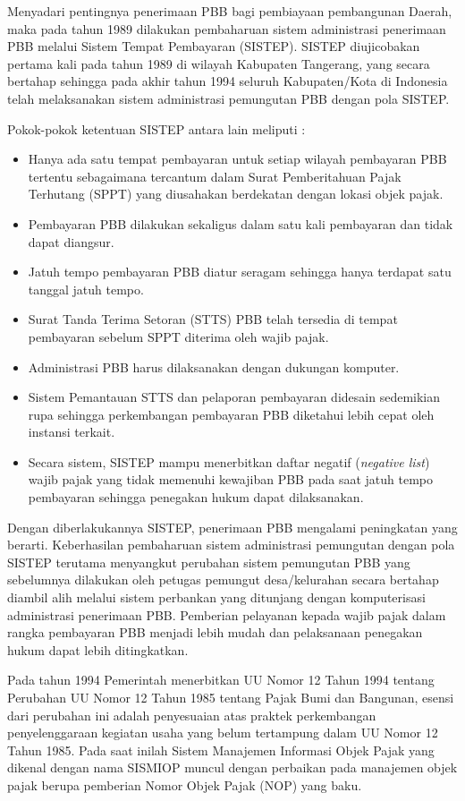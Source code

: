 \documentclass[pdftex, 12pt, oneside]{article}
\begin{document}
Menyadari pentingnya penerimaan PBB bagi pembiayaan pembangunan Daerah, maka pada tahun 1989 dilakukan pembaharuan sistem administrasi penerimaan PBB melalui Sistem Tempat Pembayaran (SISTEP). SISTEP diujicobakan pertama kali pada tahun 1989 di wilayah Kabupaten Tangerang, yang secara bertahap sehingga pada akhir tahun 1994 seluruh Kabupaten/Kota di Indonesia telah melaksanakan sistem administrasi pemungutan PBB dengan pola SISTEP.

Pokok-pokok ketentuan SISTEP antara lain meliputi :

\begin{itemize}
  \item Hanya ada satu tempat pembayaran untuk setiap wilayah pembayaran PBB tertentu sebagaimana tercantum dalam Surat Pemberitahuan Pajak Terhutang (SPPT) yang diusahakan berdekatan dengan lokasi objek pajak.
  \item Pembayaran PBB dilakukan sekaligus dalam satu kali pembayaran dan tidak dapat diangsur.
  \item Jatuh tempo pembayaran PBB diatur seragam sehingga hanya terdapat satu tanggal jatuh tempo.
  \item Surat Tanda Terima Setoran (STTS) PBB telah tersedia di tempat pembayaran sebelum SPPT diterima oleh wajib pajak.
  \item Administrasi PBB harus dilaksanakan dengan dukungan komputer.
  \item Sistem Pemantauan STTS dan pelaporan pembayaran didesain sedemikian rupa sehingga perkembangan pembayaran PBB diketahui lebih cepat oleh instansi terkait.
  \item Secara sistem, SISTEP mampu menerbitkan daftar negatif (\textit{negative list}) wajib pajak yang tidak memenuhi kewajiban PBB pada saat jatuh tempo pembayaran sehingga penegakan hukum dapat dilaksanakan.
\end{itemize}

Dengan diberlakukannya SISTEP, penerimaan PBB mengalami peningkatan yang berarti. Keberhasilan pembaharuan sistem administrasi pemungutan dengan pola SISTEP terutama menyangkut perubahan sistem pemungutan PBB yang sebelumnya dilakukan oleh petugas pemungut desa/kelurahan secara bertahap diambil alih melalui sistem perbankan yang ditunjang dengan komputerisasi administrasi penerimaan PBB. Pemberian pelayanan kepada wajib pajak dalam rangka pembayaran PBB menjadi lebih mudah dan pelaksanaan penegakan hukum dapat lebih ditingkatkan.

Pada tahun 1994 Pemerintah menerbitkan UU Nomor 12 Tahun 1994 tentang Perubahan UU Nomor 12 Tahun 1985 tentang Pajak Bumi dan Bangunan, esensi dari perubahan ini adalah penyesuaian atas praktek perkembangan penyelenggaraan kegiatan usaha yang belum tertampung dalam UU Nomor 12 Tahun 1985. Pada saat inilah Sistem Manajemen Informasi Objek Pajak yang dikenal dengan nama SISMIOP muncul dengan perbaikan pada manajemen objek pajak berupa pemberian Nomor Objek Pajak (NOP) yang baku.
\end{document}
